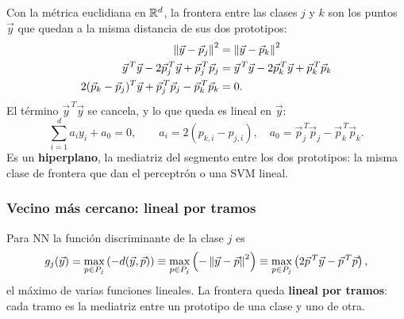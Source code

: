 \documentclass[11pt,letterpaper]{article}
\begin{document}
Con la métrica euclidiana en $\mathbb{R}^d$, la frontera entre las clases $j$
y $k$ son los puntos $\vec{y}$ que quedan a la misma distancia de sus
dos prototipos:
\begin{align*}
    \left\lVert \vec{y} - \vec{p}_j \right\rVert^2 &= \left\lVert \vec{y} - \vec{p}_k \right\rVert^2 \\
    \vec{y}^{\,T}\vec{y} - 2\vec{p}_j^{\,T}\vec{y}
      + \vec{p}_j^{\,T}\vec{p}_j
    &= \vec{y}^{\,T}\vec{y} - 2\vec{p}_k^{\,T}\vec{y}
      + \vec{p}_k^{\,T}\vec{p}_k \\
    2(\vec{p}_k - \vec{p}_j)^{T}\vec{y}
      + \vec{p}_j^{\,T}\vec{p}_j - \vec{p}_k^{\,T}\vec{p}_k &= 0 .
\end{align*}
El término $\vec{y}^{\,T}\vec{y}$ se cancela, y lo que queda es
lineal en $\vec{y}$:
\[
    \sum_{i=1}^{d} a_i y_i + a_0 = 0 , \qquad
    a_i = 2(p_{k,i} - p_{j,i}) , \quad
    a_0 = \vec{p}_j^{\,T}\vec{p}_j - \vec{p}_k^{\,T}\vec{p}_k .
\]
Es un \textbf{hiperplano}, la mediatriz del segmento entre los dos
prototipos: la misma clase de frontera que dan el perceptrón o una
SVM lineal.

\subsubsection*{Vecino más cercano: lineal por tramos}

Para NN la función discriminante de la clase $j$ es
\[
    g_j(\vec{y}) = \max_{p \in P_j}\left(-d(\vec{y}, \vec{p})\right)
    \equiv \max_{p \in P_j}\left(-\left\lVert \vec{y} - \vec{p} \right\rVert^2\right)
    \equiv \max_{p \in P_j}\left(2\vec{p}^{\,T}\vec{y}
    - \vec{p}^{\,T}\vec{p}\right) ,
\]
el máximo de varias funciones lineales. La frontera queda
\textbf{lineal por tramos}: cada tramo es la mediatriz entre un
prototipo de una clase y uno de otra.
\end{document}
